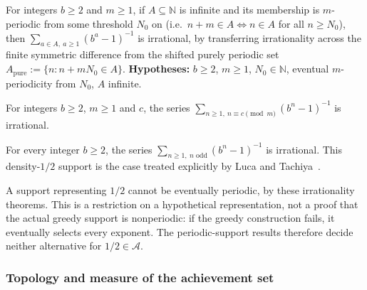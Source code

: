 \begin{thm}\label{thm:eventually-periodic-support}
For integers $b\ge2$ and $m\ge1$, if $A\subseteq\mathbb N$ is infinite and its membership is $m$-periodic from
some threshold $N_0$ on (i.e.\ $n+m \in A \Leftrightarrow n \in A$ for all $n \ge N_0$), then
$\sum_{a\in A,\ a\ge1}(b^a-1)^{-1}$ is irrational, by transferring irrationality across the finite
symmetric difference from the shifted purely periodic set $A_{\mathrm{pure}} := \{n : n + m N_0 \in
A\}$. \textbf{Hypotheses:} $b \ge 2$, $m \ge 1$, $N_0 \in \mathbb{N}$, eventual $m$-periodicity from
$N_0$, $A$ infinite.
\end{thm}

\begin{thm}\label{thm:residue-class-support}
For integers $b\ge2$, $m\ge1$ and $c$, the series
$\sum_{n\ge1,\ n\equiv c\pmod m}(b^n-1)^{-1}$ is irrational.
\end{thm}

\begin{thm}\label{thm:odd-support}
For every integer $b\ge2$, the series
$\sum_{n\ge1,\ n\text{ odd}}(b^n-1)^{-1}$ is irrational. This density-$1/2$ support is
the case treated explicitly by Luca and Tachiya~\cite[Example~2, p.~140]{lucatachiya2017}.
\end{thm}

A support representing $1/2$ cannot be eventually periodic, by these
irrationality theorems.  This is a restriction on a hypothetical
representation, not a proof that the actual greedy support is nonperiodic:
if the greedy construction fails, it eventually selects every exponent.
The periodic-support results therefore decide neither alternative for
$1/2\in\mathcal A$.

\subsubsection{Topology and measure of the achievement set}

